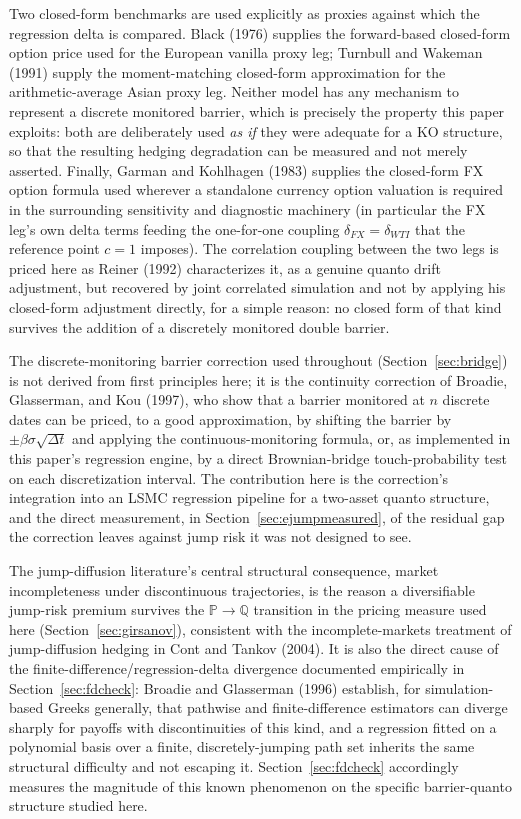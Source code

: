 \documentclass[11pt,a4paper]{article}
\begin{document}
Two closed-form benchmarks are used explicitly as proxies against which the regression delta is compared. Black (1976) supplies the forward-based closed-form option price used for the European vanilla proxy leg; Turnbull and Wakeman (1991) supply the moment-matching closed-form approximation for the arithmetic-average Asian proxy leg. Neither model has any mechanism to represent a discrete monitored barrier, which is precisely the property this paper exploits: both are deliberately used \emph{as if} they were adequate for a KO structure, so that the resulting hedging degradation can be measured and not merely asserted. Finally, Garman and Kohlhagen (1983) supplies the closed-form FX option formula used wherever a standalone currency option valuation is required in the surrounding sensitivity and diagnostic machinery (in particular the FX leg's own delta terms feeding the one-for-one coupling $\delta_{FX}=\delta_{WTI}$ that the reference point $c=1$ imposes). The correlation coupling between the two legs is priced here as Reiner (1992) characterizes it, as a genuine quanto drift adjustment, but recovered by joint correlated simulation and not by applying his closed-form adjustment directly, for a simple reason: no closed form of that kind survives the addition of a discretely monitored double barrier.

The discrete-monitoring barrier correction used throughout (Section~\ref{sec:bridge}) is not derived from first principles here; it is the continuity correction of Broadie, Glasserman, and Kou (1997), who show that a barrier monitored at $n$ discrete dates can be priced, to a good approximation, by shifting the barrier by $\pm\beta\sigma\sqrt{\Delta t}$ and applying the continuous-monitoring formula, or, as implemented in this paper's regression engine, by a direct Brownian-bridge touch-probability test on each discretization interval. The contribution here is the correction's integration into an LSMC regression pipeline for a two-asset quanto structure, and the direct measurement, in Section~\ref{sec:ejumpmeasured}, of the residual gap the correction leaves against jump risk it was not designed to see.

The jump-diffusion literature's central structural consequence, market incompleteness under discontinuous trajectories, is the reason a diversifiable jump-risk premium survives the $\mathbb{P}\to\mathbb{Q}$ transition in the pricing measure used here (Section~\ref{sec:girsanov}), consistent with the incomplete-markets treatment of jump-diffusion hedging in Cont and Tankov (2004). It is also the direct cause of the finite-difference/regression-delta divergence documented empirically in Section~\ref{sec:fdcheck}: Broadie and Glasserman (1996) establish, for simulation-based Greeks generally, that pathwise and finite-difference estimators can diverge sharply for payoffs with discontinuities of this kind, and a regression fitted on a polynomial basis over a finite, discretely-jumping path set inherits the same structural difficulty and not escaping it. Section~\ref{sec:fdcheck} accordingly measures the magnitude of this known phenomenon on the specific barrier-quanto structure studied here.
\end{document}
